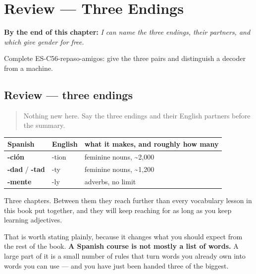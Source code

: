 
\chapter{Review --- Three Endings}
\label{ch:review-friends}

\begin{chapteropening}
\textbf{By the end of this chapter:} \emph{I can name the three endings, their partners, and which give gender for free.}

Complete ES-C56-repaso-amigos: give the three pairs and distinguish a decoder from a machine.
\end{chapteropening}

\section[Practice]{Review — three endings}

\label{lesson:ES-C56-repaso-amigos}



\begin{quote}
Nothing new here. Say the three endings and their English partners before the summary.
\end{quote}

\begin{grammarlens}[title={What you've built}]
\noindent
\begin{tabularx}{\linewidth}{@{}>{\raggedright\arraybackslash}X>{\raggedright\arraybackslash}X>{\raggedright\arraybackslash}X@{}}
\toprule
\textbf{Spanish} & \textbf{English} & \textbf{what it makes, and roughly how many} \\
\midrule
\textbf{-ción} & -tion & feminine nouns, \textasciitilde{}2,000 \\
\textbf{-dad} / \textbf{-tad} & -ty & feminine nouns, \textasciitilde{}1,200 \\
\textbf{-mente} & -ly & adverbs, no limit \\
\bottomrule
\end{tabularx}

Three chapters. Between them they reach further than every vocabulary lesson in this book put together, and they will keep reaching for as long as you keep learning adjectives.

That is worth stating plainly, because it changes what you should expect from the rest of the book. \textbf{A Spanish course is not mostly a list of words.} A large part of it is a small number of rules that turn words you already own into words you can use — and you have just been handed three of the biggest.
\end{grammarlens}

